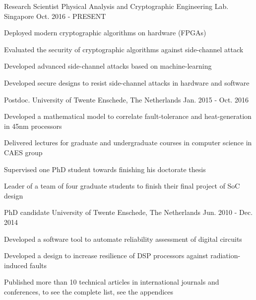 

\begin{cventries}

  \cventry
    {Research Scientist} %
    {Physical Analysis and Cryptographic Engineering Lab.} %
    {Singapore} %
    {Oct. 2016 - PRESENT} %
    {
      \begin{cvitems} %
	\item {Deployed modern cryptographic algorithms on hardware (FPGAs)}
        \item {Evaluated the security of cryptographic algorithms against side-channel attack}
        \item {Developed advanced side-channel attacks based on machine-learning}
        \item {Developed secure designs to resist side-channel attacks in hardware and software}
      \end{cvitems}
    }

  \cventry
    {Postdoc.} %
    {University of Twente} %
    {Enschede, The Netherlands} %
    {Jan. 2015 - Oct. 2016} %
    {
      \begin{cvitems} %
        \item {Developed a mathematical model to correlate fault-tolerance and heat-generation in 45nm processors}
        \item {Delivered lectures for graduate and undergraduate courses in computer science in CAES group}
	\item {Supervised one PhD student towards finishing his doctorate thesis}
	\item {Leader of a team of four graduate students to finish their final project of SoC design}
      \end{cvitems}
    }

  \cventry
    {PhD candidate} %
    {University of Twente} %
    {Enschede, The Netherlands} %
    {Jun. 2010 - Dec. 2014} %
    {
      \begin{cvitems} %
	\item {Developed a software tool to automate reliability assessment of digital circuits}
        \item {Developed a design to increase resilience of DSP processors against radiation-induced faults}
	\item{Published more than 10 technical articles in international journals and conferences, to see the complete list, see the appendices}
      \end{cvitems}
    }


\end{cventries}
